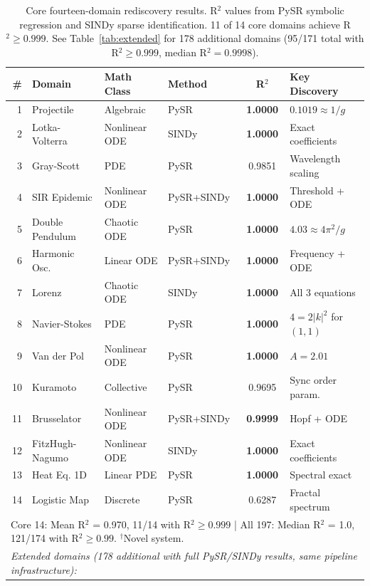 \begin{table}[t]
\centering
\caption{Core fourteen-domain rediscovery results. R$^2$ values from PySR symbolic regression and SINDy sparse identification. 11 of 14 core domains achieve R$^2 \geq 0.999$. See Table~\ref{tab:extended} for 178 additional domains (95/171 total with R$^2 \geq 0.999$, median R$^2 = 0.9998$).}
\label{tab:results}
\small
\begin{tabular}{rlllcl}
\toprule
\# & Domain & Math Class & Method & R$^2$ & Key Discovery \\
\midrule
1 & Projectile & Algebraic & PySR & \textbf{1.0000} & $0.1019 \approx 1/g$ \\
2 & Lotka-Volterra & Nonlinear ODE & SINDy & \textbf{1.0000} & Exact coefficients \\
3 & Gray-Scott & PDE & PySR & 0.9851 & Wavelength scaling \\
4 & SIR Epidemic & Nonlinear ODE & PySR+SINDy & \textbf{1.0000} & Threshold + ODE \\
5 & Double Pendulum & Chaotic ODE & PySR & \textbf{1.0000} & $4.03 \approx 4\pi^2/g$ \\
6 & Harmonic Osc. & Linear ODE & PySR+SINDy & \textbf{1.0000} & Frequency + ODE \\
7 & Lorenz & Chaotic ODE & SINDy & \textbf{1.0000} & All 3 equations \\
8 & Navier-Stokes & PDE & PySR & \textbf{1.0000} & $4=2|k|^2$ for $(1,1)$ \\
9 & Van der Pol & Nonlinear ODE & PySR & \textbf{1.0000} & $A=2.01$ \\
10 & Kuramoto & Collective & PySR & 0.9695 & Sync order param. \\
11 & Brusselator & Nonlinear ODE & PySR+SINDy & \textbf{0.9999} & Hopf + ODE \\
12 & FitzHugh-Nagumo & Nonlinear ODE & SINDy & \textbf{1.0000} & Exact coefficients \\
13 & Heat Eq. 1D & Linear PDE & PySR & \textbf{1.0000} & Spectral exact \\
14 & Logistic Map & Discrete & PySR & 0.6287 & Fractal spectrum \\
\midrule
\multicolumn{6}{l}{Core 14: Mean R$^2$ = 0.970, 11/14 with R$^2 \geq 0.999$ | All 197: Median R$^2$ = 1.0, 121/174 with R$^2 \geq 0.99$. $^\dagger$Novel system.} \\
\midrule
\multicolumn{6}{l}{\textit{Extended domains (178 additional with full PySR/SINDy results, same pipeline infrastructure):}} \\
\midrule

\end{tabular}
\end{table}
